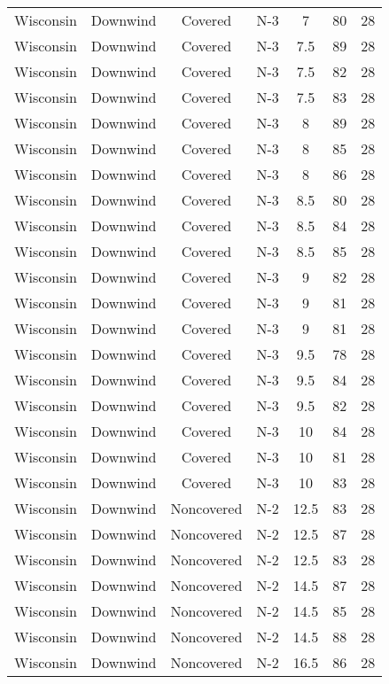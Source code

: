 \documentclass{article}
\begin{document}
\begin{longtable}[H]{ccccccc}
Wisconsin & Downwind & Covered     & N-3 & 7    & 80  & 28 \\
Wisconsin & Downwind & Covered     & N-3 & 7.5  & 89  & 28 \\
Wisconsin & Downwind & Covered     & N-3 & 7.5  & 82  & 28 \\
Wisconsin & Downwind & Covered     & N-3 & 7.5  & 83  & 28 \\
Wisconsin & Downwind & Covered     & N-3 & 8    & 89  & 28 \\
Wisconsin & Downwind & Covered     & N-3 & 8    & 85  & 28 \\
Wisconsin & Downwind & Covered     & N-3 & 8    & 86  & 28 \\
Wisconsin & Downwind & Covered     & N-3 & 8.5  & 80  & 28 \\
Wisconsin & Downwind & Covered     & N-3 & 8.5  & 84  & 28 \\
Wisconsin & Downwind & Covered     & N-3 & 8.5  & 85  & 28 \\
Wisconsin & Downwind & Covered     & N-3 & 9    & 82  & 28 \\
Wisconsin & Downwind & Covered     & N-3 & 9    & 81  & 28 \\
Wisconsin & Downwind & Covered     & N-3 & 9    & 81  & 28 \\
Wisconsin & Downwind & Covered     & N-3 & 9.5  & 78  & 28 \\
Wisconsin & Downwind & Covered     & N-3 & 9.5  & 84  & 28 \\
Wisconsin & Downwind & Covered     & N-3 & 9.5  & 82  & 28 \\
Wisconsin & Downwind & Covered     & N-3 & 10   & 84  & 28 \\
Wisconsin & Downwind & Covered     & N-3 & 10   & 81  & 28 \\
Wisconsin & Downwind & Covered     & N-3 & 10   & 83  & 28 \\
Wisconsin & Downwind & Noncovered & N-2 & 12.5 & 83  & 28 \\
Wisconsin & Downwind & Noncovered & N-2 & 12.5 & 87  & 28 \\
Wisconsin & Downwind & Noncovered & N-2 & 12.5 & 83  & 28 \\
Wisconsin & Downwind & Noncovered & N-2 & 14.5 & 87  & 28 \\
Wisconsin & Downwind & Noncovered & N-2 & 14.5 & 85  & 28 \\
Wisconsin & Downwind & Noncovered & N-2 & 14.5 & 88  & 28 \\
Wisconsin & Downwind & Noncovered & N-2 & 16.5 & 86  & 28 \\

\end{longtable}
\end{document}
